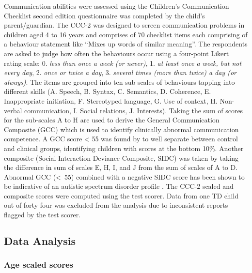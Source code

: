 \documentclass[a4paper, twoside]{templates/ociamthesis}
\begin{document}
Communication abilities were assessed using the Children's Communication Checklist second edition questionnaire \autocite[CCC-2;][]{Bishop2003} was completed by the child's parent/guardian. The CCC-2 was designed to screen communication problems in children aged 4 to 16 years and comprises of 70 checklist items each comprising of a behaviour statement like ``Mixes up words of similar meaning''. The respondents are asked to judge how often the behaviours occur using a four-point Likert rating scale: 0. \emph{less than once a week (or never)}, 1. \emph{at least once a week, but not every day}, 2. \emph{once or twice a day}, 3. \emph{several times (more than twice) a day (or always)}. The items are grouped into ten sub-scales of behaviours tapping into different skills (A. Speech, B. Syntax, C. Semantics, D. Coherence, E. Inappropriate initiation, F. Stereotyped language, G. Use of context, H. Non-verbal communication, I. Social relations, J. Interests). Taking the sum of scores for the sub-scales A to H are used to derive the General Communication Composite (GCC) which is used to identify clinically abnormal communication competence. A GCC score \textless{} 55 was found by \textcite{Norbury2005} to well separate between control and clinical groups, identifying children with scores at the bottom 10\%. Another composite (Social-Interaction Deviance Composite, SIDC) was taken by taking the difference in sum of scales E, H, I, and J from the sum of scales of A to D. Abnormal GCC (\textless~55) combined with a negative SIDC score has been shown to be indicative of an autistic spectrum disorder profile \autocite{Bishop2003}. The CCC-2 scaled and composite scores were computed using the test scorer. Data from one TD child out of forty four was excluded from the analysis due to inconsistent reports flagged by the test scorer.

\hypertarget{data-analysis}{%
\subsection{Data Analysis}\label{data-analysis}}

\hypertarget{z-scores}{%
\subsubsection{Age scaled scores}\label{z-scores}}
\end{document}
